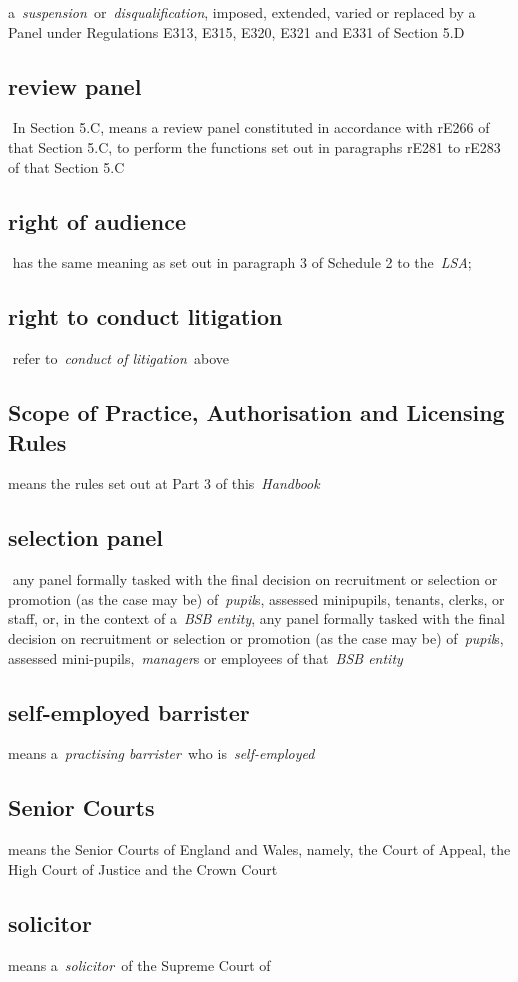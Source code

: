   a~\emph{suspension~}or~\emph{disqualification}, imposed, extended,
  varied or replaced by a Panel under Regulations E313, E315, E320, E321
  and E331 of Section 5.D  \subsection{review panel } In Section 5.C, means a review panel
  constituted in accordance with rE266 of that Section 5.C, to perform
  the functions set out in paragraphs rE281 to rE283 of that Section
  5.C  \subsection{right of audience } has the same meaning as set out in
  paragraph 3 of Schedule 2 to the~\emph{LSA};  \subsection{right to conduct litigation } refer to~\emph{conduct of
  litigation~}above
    \subsection{Scope of Practice, Authorisation and Licensing Rules } means
  the rules set out at Part 3 of this~\emph{Handbook} \subsection{selection panel } any panel formally tasked with the final
  decision on recruitment or selection or promotion (as the case may be)
  of~\emph{pupil}s, assessed minipupils, tenants, clerks, or staff, or,
  in the context of a~\emph{BSB entity}, any panel formally tasked with
  the final decision on recruitment or selection or promotion (as the
  case may be) of~\emph{pupil}s, assessed mini-pupils,~\emph{manager}s
  or employees of that~\emph{BSB entity} \subsection{self-employed barrister } means a~\emph{practising
  barrister~}who is~\emph{self-employed} \subsection{Senior Courts } means the Senior Courts of England and Wales,
  namely, the Court of Appeal, the High Court of Justice and the Crown
  Court  \subsection{solicitor } means a~\emph{solicitor~}of the Supreme Court of
